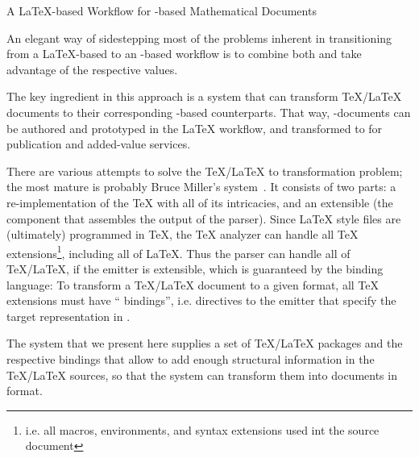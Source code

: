 \begin{tsubsection}{A {\LaTeX}-based Workflow for {\xml}-based Mathematical Documents}
 
  An elegant way of sidestepping most of the problems inherent in transitioning from a
  {\LaTeX}-based to an {\xml}-based workflow is to combine both and take advantage of the
  respective values.
 
  The key ingredient in this approach is a system that can transform {\TeX/\LaTeX}
  documents to their corresponding {\xml}-based counterparts. That way, {\xml}-documents
  can be authored and prototyped in the {\LaTeX} workflow, and transformed to {\xml} for
  publication and added-value services.
 
  There are various attempts to solve the {\TeX/\LaTeX} to {\xml} transformation problem;
  the most mature is probably Bruce Miller's {\latexml} system~\cite{Miller:latexml}. It
  consists of two parts: a re-implementation of the {\TeX} {} with all
  of its intricacies, and an extensible {\xml} {} (the component that
  assembles the output of the parser). Since {\LaTeX} style files are (ultimately)
  programmed in {\TeX}, the {\TeX} analyzer can handle all {\TeX}
  extensions\footnote{i.e. all macros, environments, and syntax extensions used int the
    source document}, including all of {\LaTeX}. Thus the {\latexml} parser can handle all
  of {\TeX/\LaTeX}, if the emitter is extensible, which is guaranteed by the {\latexml}
  binding language: To transform a {\TeX/\LaTeX} document to a given {\xml} format, all
  {\TeX} extensions must have ``{\latexml} bindings'',
  i.e. directives to the {\latexml} emitter that specify the target representation in
  {\xml}.

  The {\stex} system that we present here supplies a set of {\TeX/\LaTeX} packages and the
  respective {\latexml} bindings that allow to add enough structural information in the
  {\TeX/\LaTeX} sources, so that the {\latexml} system can transform them into documents
  in {\omdoc} format.
\end{tsubsection}

